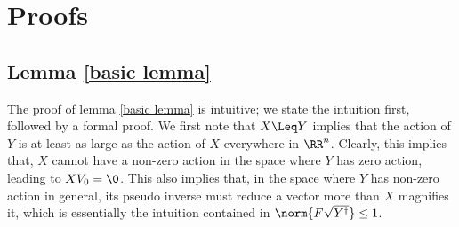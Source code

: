 \section{Proofs}
\subsection{Lemma \ref{basic lemma}}
The proof of lemma \ref{basic lemma} is intuitive; we state the intuition first, followed by a formal proof. We first note that $X \Leq Y$ implies that the action of $Y$ is at least as large as the action of $X$ everywhere in $\RR^n$. Clearly, this implies that, $X$ cannot have a non-zero action in the space where $Y$ has zero action, leading to $X V_0 = \0$. This also implies that, in the space where $Y$ has non-zero action in general, its pseudo inverse must reduce a vector more than $X$ magnifies it, which is essentially the intuition contained in $\norm{F \sqrt{Y^{\dagger}} } \leq 1$. 

